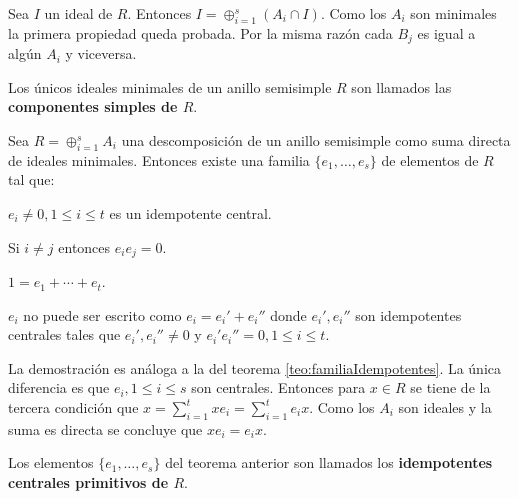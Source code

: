 \begin{proof*}
Sea $I$ un ideal de $R$. Entonces $I = \oplus_{i = 1}^{s}(A_i \cap I)$. Como los $A_i$ son minimales la primera propiedad queda probada. Por la misma razón cada $B_j$ es igual a algún $A_i$ y viceversa. 
\end{proof*}
\begin{definicion}
Los únicos ideales minimales de un anillo semisimple $R$ son llamados las \textbf{componentes simples de $R$}. 
\end{definicion}
\begin{teorema}
Sea $R = \oplus_{i = 1}^sA_i$ una descomposición de un anillo semisimple como suma directa de ideales minimales. Entonces existe una familia $\{e_1, \dots, e_s \}$ de elementos de $R$ tal que:
\begin{bulletList}
\item $e_i \neq 0, 1\leq i  \leq t$ es un idempotente central.
\item Si $i \neq j$ entonces $e_ie_j = 0$.
\item $1 = e_1 + \cdots + e_t$.
\item $e_i$ no puede ser escrito como $e_i = e_i'+e_i''$ donde $e_i', e_i''$ son idempotentes centrales tales que $e_i',e_i'' \neq 0$ y $e_i'e_i'' = 0, 1\leq i \leq t$.
\end{bulletList}
\end{teorema}
\begin{proof*}
La demostración es análoga a la del teorema \ref{teo:familiaIdempotentes}. La única diferencia es que $e_i, 1\leq i \leq s$ son centrales. Entonces para $x \in R$ se tiene de la tercera condición que $x = \sum_{i=1}^{t}xe_i = \sum_{i=1}^{t}e_ix$. Como los $A_i$ son ideales y la suma es directa se concluye que $xe_i = e_ix$.
\end{proof*}
\begin{definicion}
Los elementos $\{ e_1, \dots, e_s \}$ del  teorema anterior son llamados los \textbf{idempotentes centrales primitivos de $R$}.
\end{definicion}
